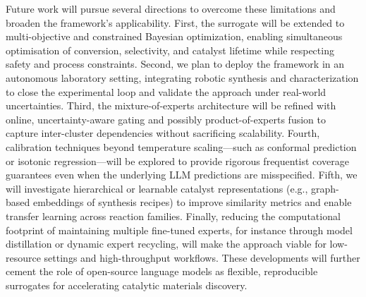 \documentclass{article}
\begin{document}
Future work will pursue several directions to overcome these limitations and broaden the framework's applicability. First, the surrogate will be extended to multi-objective and constrained Bayesian optimization, enabling simultaneous optimisation of conversion, selectivity, and catalyst lifetime while respecting safety and process constraints. Second, we plan to deploy the framework in an autonomous laboratory setting, integrating robotic synthesis and characterization to close the experimental loop and validate the approach under real-world uncertainties. Third, the mixture-of-experts architecture will be refined with online, uncertainty-aware gating and possibly product-of-experts fusion to capture inter-cluster dependencies without sacrificing scalability. Fourth, calibration techniques beyond temperature scaling—such as conformal prediction or isotonic regression—will be explored to provide rigorous frequentist coverage guarantees even when the underlying LLM predictions are misspecified. Fifth, we will investigate hierarchical or learnable catalyst representations (e.g., graph-based embeddings of synthesis recipes) to improve similarity metrics and enable transfer learning across reaction families. Finally, reducing the computational footprint of maintaining multiple fine-tuned experts, for instance through model distillation or dynamic expert recycling, will make the approach viable for low-resource settings and high-throughput workflows. These developments will further cement the role of open-source language models as flexible, reproducible surrogates for accelerating catalytic materials discovery.



\end{document}
